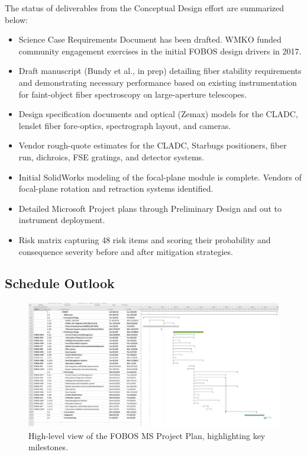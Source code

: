\documentclass[oneside,11pt]{amsart}
\begin{document}
\noindent The status of deliverables from the Conceptual Design effort are summarized below:

\begin{itemize}
%
\item Science Case Requirements Document has been drafted.  WMKO funded community engagement exercises in the initial
FOBOS design drivers in 2017.
%
\item Draft manuscript (Bundy et al., in prep) detailing fiber stability requirements and demonstrating
necessary performance based on existing instrumentation for faint-object
fiber spectroscopy on large-aperture telescopes.
%
\item Design specification documents and optical (Zemax) models for the
CLADC, lenslet fiber fore-optics, spectrograph layout, and cameras.
%
\item Vendor rough-quote estimates for the CLADC, Starbugs positioners, fiber
run, dichroics, FSE gratings, and detector
systems.
%
\item Initial SolidWorks modeling of the focal-plane module is complete.  
Vendors of focal-plane rotation and retraction systems identified.
%
\item Detailed Microsoft Project plans through Preliminary Design and
out to instrument deployment.  
%
\item Risk matrix capturing 48 risk items and scoring their probability
and consequence severity before and after mitigation strategies.
%
\end{itemize}

\subsection{Schedule Outlook}

\begin{figure}[h!]
\vskip -0.1in
\includegraphics[width=\textwidth]{gantt_v1.pdf}
\caption{\small High-level view of the FOBOS MS Project Plan, highlighting key milestones.}
\label{fig:gantt}
\end{figure}
\end{document}
